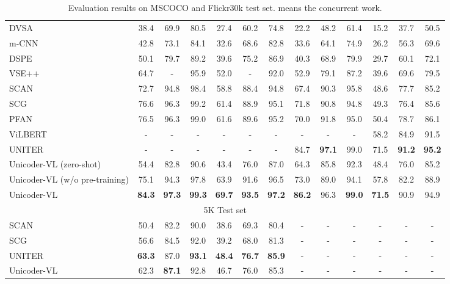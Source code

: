 \documentclass[letterpaper]{article} \usepackage{aaai20}  \usepackage{times}  \usepackage{helvet} \usepackage{courier}  \usepackage[hyphens]{url}  \usepackage{graphicx} \urlstyle{rm} \def\UrlFont{\rm}  \usepackage{graphicx}  \frenchspacing  \setlength{\pdfpagewidth}{8.5in}  \setlength{\pdfpageheight}{11in}  \usepackage{amssymb}
\begin{document}
\begin{table*}[!htbp]
{\begin{tabular}{lcccccccccccc}
  \midrule
DVSA~\cite{karpathy2015deep}  &	38.4 &	69.9 &	80.5  &	27.4 &	60.2 &	74.8  &	22.2 &48.2 &61.4  &	15.2 &	37.7 &	50.5 \\
    m-CNN~\cite{ma2015multimodal}  &	42.8 &	73.1 &	84.1  &	32.6 &	68.6 &	82.8 &33.6 &	64.1 &74.9  &26.2 &	56.3 &69.6    \\
    DSPE~\cite{wang2016learning}  &	50.1 &	79.7 &	89.2  &	39.6 &	75.2 &	86.9 &40.3 &68.9 &79.9  &29.7 &60.1 &72.1  \\
    VSE++~\cite{faghri2017vse++} &	64.7 &	- &	95.9  &	52.0 & - &	92.0  &52.9 &79.1 &87.2  &39.6 &69.6 &79.5 \\
SCAN~\cite{lee2018stacked} &	72.7 &	94.8 &	98.4  &	58.8 &	88.4 &	94.8 &67.4 &90.3 &95.8  &48.6 &	77.7 &85.2 \\
   SCG~\cite{ijcai2019-720}  &	76.6 &	96.3 &	99.2  &	61.4 &	88.9 &	95.1 &71.8 &90.8 &94.8 &49.3 &76.4 &85.6 \\
    PFAN~\cite{ijcai2019-526}  & 76.5 &	96.3 &	99.0  &	61.6 &	89.6 &	95.2 &70.0 &91.8 &95.0 &50.4 &78.7 &86.1 \\
ViLBERT~\cite{lu2019vilbert} &- &- &- &- &- &- &- &- &- &58.2 &84.9 &91.5 \\
UNITER~\cite{chen2019uniter} &- &- &- &- &- &- &84.7 &\textbf{97.1} &99.0 &71.5 &\textbf{91.2} &\textbf{95.2} \\
  \midrule
    Unicoder-VL (zero-shot)  &54.4 &82.8 & 90.6  &43.4 &76.0 &87.0 &64.3 &85.8 & 92.3  &48.4 &76.0 &85.2 \\
    Unicoder-VL (w/o pre-training)  &	75.1 &94.3 & 97.8  &63.9 &91.6 &96.5 &73.0 &89.0 & 94.1  &57.8 &82.2 &88.9 \\
    Unicoder-VL  &	\textbf{84.3} &\textbf{97.3} &\textbf{99.3}  &	\textbf{69.7} &\textbf{93.5} &\textbf{97.2} &	\textbf{86.2} &96.3 &\textbf{99.0}  &\textbf{71.5} &90.9 &94.9 \\
    \midrule 
\multicolumn{13}{c}{5K Test set } \\
  \midrule
SCAN~\cite{lee2018stacked}  & 50.4 &	82.2 &	90.0  & 38.6 &	69.3 &	80.4 &- &- &- &- &- &-  \\
  SCG~\cite{ijcai2019-720}  &56.6 &84.5 &92.0  &39.2 &	68.0 &	81.3 &- &- &- &- &- &-  \\
UNITER~\cite{chen2019uniter}  &\textbf{63.3}  &87.0 &\textbf{93.1}  &\textbf{48.4} &\textbf{76.7} &	\textbf{85.9} &- &- &- &- &- &-  \\
  \midrule
Unicoder-VL  &62.3 &\textbf{87.1} & 92.8  &46.7 &76.0 &85.3 &- &- &-  &- &- &- \\
  \bottomrule 
 \end{tabular}}
\caption{Evaluation results on MSCOCO and Flickr30k test set. means the concurrent work.}
\label{retrievalresult}
\end{table*}
\end{document}
